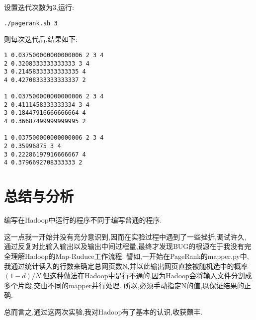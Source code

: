 \documentclass[a4paper]{article}
\begin{document}
设置迭代次数为3,运行:
\begin{verbatim}
./pagerank.sh 3
\end{verbatim}

则每次迭代后,结果如下:
\begin{verbatim}
1 0.037500000000000006 2 3 4    
2 0.3208333333333333 3 4    
3 0.21458333333333335 4 
4 0.42708333333333337 2 

1 0.037500000000000006 2 3 4    
2 0.4111458333333334 3 4    
3 0.18447916666666664 4 
4 0.36687499999999995 2 

1 0.037500000000000006 2 3 4    
2 0.35996875 3 4    
3 0.22286197916666667 4 
4 0.3796692708333333 2  
\end{verbatim}
\newpage
\section{总结与分析}
编写在Hadoop中运行的程序不同于编写普通的程序.

这一点我一开始并没有充分意识到,因而在实验过程中遇到了一些挫折,调试许久,
通过反复对比输入输出以及输出中间过程量,最终才发现BUG的根源在于我没有完全理解Hadoop的Map-Ruduce工作流程.
譬如,一开始在PageRank的mapper.py中,我通过统计读入的行数来确定总网页数N,并以此输出网页直接被随机选中的概率
$(1-d)/N$,但这种做法在Hadoop中是行不通的,因为Hadoop会将输入文件分割成多个片段,交由不同的mapper并行处理.
所以,必须手动指定N的值,以保证结果的正确.

总而言之,通过这两次实验,我对Hadoop有了基本的认识,收获颇丰.
\end{document}
